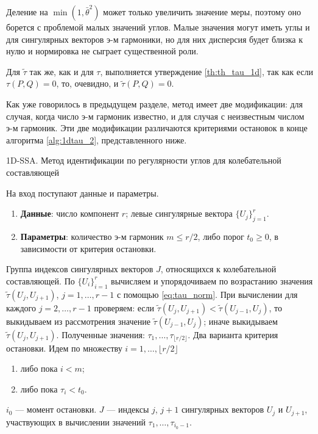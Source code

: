 \documentclass[specialist,
               substylefile = spbu.rtx,
               subf,href,colorlinks=true, 12pt]{disser}
\begin{document}
Деление на $\min(1, \bar{\theta}^2)$ может только увеличить значение меры, поэтому оно борется с проблемой малых значений углов. Малые значения могут иметь углы и для сингулярных векторов э-м гармоники, но для них дисперсия будет близка к нулю и нормировка не сыграет существенной роли.

Для $\tilde{\tau}$ так же, как и для $\tau$, выполняется утверждение \ref{th:th_tau_1d}, так как если $\tau(P, Q) = 0$, то, очевидно, и $\tilde{\tau}(P, Q) = 0$. 

Как уже говорилось в предыдущем разделе, метод имеет две модификации: для случая, когда число э-м гармоник известно, и для случая с неизвестным числом э-м гармоник. Эти две модификации различаются критериями остановок в конце алгоритма \ref{alg:1dtau_2}, представленного ниже.

\begin{algorithm}[!hhh]
\caption{1D-SSA. Метод идентификации по регулярности углов для колебательной составляющей}
\label{alg:1dtau_2}
\begin{algorithmic}[1]
\REQUIRE На вход поступают данные и параметры.
\begin{enumerate}
\item \textbf{Данные}: число компонент $r$; левые сингулярные вектора $\{U_j\}_{j=1}^{r}$.\\
\item \textbf{Параметры}: количество э-м гармоник $m \leqslant r/2$, либо порог $t_0 \geqslant 0$, в зависимости от критерия остановки.
\end{enumerate}
\ENSURE Группа индексов сингулярных векторов $J$, относящихся к колебательной составляющей.
\STATE По $\{U_i\}_{i=1}^{r}$ вычисляем и упорядочиваем по возрастанию значения $\tilde{\tau}(U_j, U_{j+1})$, $j=1,\ldots, r-1$ с помощью \eqref{eq:tau_norm}. 
При вычислении для каждого $j = 2,\ldots,r-1$ проверяем: если $\tilde{\tau}(U_j, U_{j+1}) < \tilde{\tau}(U_{j-1}, U_{j})$, то выкидываем из рассмотрения значение $\tilde{\tau}(U_{j-1}, U_{j})$; иначе выкидываем $\tilde{\tau}(U_j, U_{j+1})$.
 Полученные значения: $\tau_1, \ldots, \tau_{\lfloor r/2 \rfloor}$.
\STATE Два варианта критерия остановки. Идем по множеству $i=1,\ldots,\lfloor r/2 \rfloor$
\begin{enumerate}
\item либо пока $i < m$;
\item либо пока $\tau_i < t_0$.
\end{enumerate}
$i_0$ --- момент остановки.
\STATE $J$ --- индексы $j$, $j+1$ сингулярных векторов $U_j$ и $U_{j+1}$, участвующих в вычислении  значений $\tau_1, \ldots, \tau_{i_0 - 1}$.
\end{algorithmic}
\end{algorithm}
\end{document}
